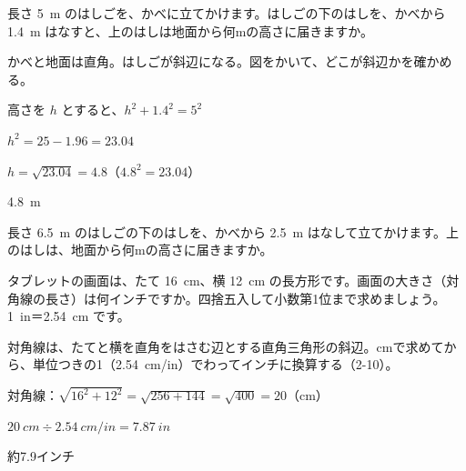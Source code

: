 \begin{reidai}[かべに立てかけたはしご]
長さ \qty{5}{m} のはしごを、かべに立てかけます。はしごの下のはしを、かべから \qty{1.4}{m} はなすと、上のはしは地面から何mの高さに届きますか。\par
\kangaekata かべと地面は直角。はしごが斜辺になる。図をかいて、どこが斜辺かを確かめる。\par
\noindent\begin{minipage}[c]{0.66\linewidth}
\shiki 高さを $h$ とすると、$h^2+1.4^2=5^2$\par
\hspace*{2.6\zw}$h^2=25-1.96=23.04$\par
\hspace*{2.6\zw}$h=\sqrt{23.04}=4.8$\quad（$4.8^2=23.04$）\par
\kotae \qty{4.8}{m}
\end{minipage}\hfill
\begin{minipage}[c]{0.3\linewidth}\centering
{}
\end{minipage}
\end{reidai}

\begin{jibun}
長さ \qty{6.5}{m} のはしごの下のはしを、かべから \qty{2.5}{m} はなして立てかけます。上のはしは、地面から何mの高さに届きますか。
\end{jibun}

\begin{reidai}
タブレットの画面は、たて \qty{16}{cm}、横 \qty{12}{cm} の長方形です。画面の大きさ（対角線の長さ）は何インチですか。四捨五入して小数第1位まで求めましょう。\qty{1}{in}＝\qty{2.54}{cm} です。\par
\kangaekata 対角線は、たてと横を直角をはさむ辺とする直角三角形の斜辺。cmで求めてから、単位つきの1（\qty{2.54}{cm/in}）でわってインチに換算する（2-10）。\par
\shiki 対角線：$\sqrt{16^2+12^2}=\sqrt{256+144}=\sqrt{400}=20$\quad（cm）\par
\hspace*{2.6\zw}$\qty{20}{cm}\div\qty{2.54}{cm/in}=\qty{7.87}{in}$\par
\kotae 約7.9インチ
\end{reidai}

